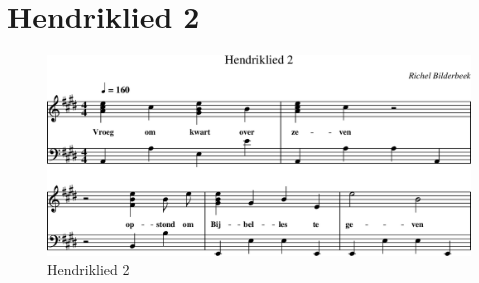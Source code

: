 \section{Hendriklied 2}



\begin{figure}[!htbp]
  \includegraphics[width=\textwidth,height=\textheight,keepaspectratio]{../songs/10_hendriklied_2.png}
  \caption{Hendriklied 2}
  \label{fig:10_hendriklied_2}
\end{figure}
